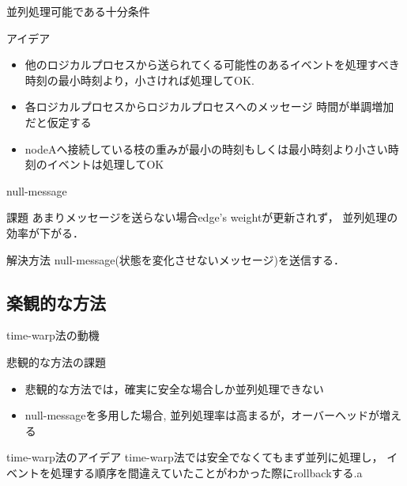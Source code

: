 \documentclass[dvipdfmx,uplatex,11pt]{beamer}
\theoremstyle{definition}
\begin{document}
\begin{frame}{並列処理可能である十分条件}
  \begin{block}{アイデア}
    \begin{itemize}
      \item 他のロジカルプロセスから送られてくる可能性のあるイベントを処理すべき時刻の最小時刻より，小さければ処理してOK.
      \item 各ロジカルプロセスからロジカルプロセスへのメッセージ
            時間が単調増加だと仮定する
          \item nodeAへ接続している枝の重みが最小の時刻もしくは最小時刻より小さい時刻のイベントは処理してOK
    \end{itemize}

  \end{block}
\end{frame}

\begin{frame}{null-message}
  \begin{block}{課題}
    あまりメッセージを送らない場合edge's weightが更新されず，
    並列処理の効率が下がる．
  \end{block}
  \begin{block}{解決方法}
    null-message(状態を変化させないメッセージ)を送信する．
  \end{block}
\end{frame}

\subsection{楽観的な方法}
\begin{frame}{time-warp法の動機}
  \begin{block}{悲観的な方法の課題}
    \begin{itemize}
  \item 悲観的な方法では，確実に安全な場合しか並列処理できない
  \item null-messageを多用した場合, 並列処理率は高まるが，オーバーヘッドが増える
\end{itemize}
  \end{block}

  \begin{block}{time-warp法のアイデア}
  time-warp法では安全でなくてもまず並列に処理し，
  イベントを処理する順序を間違えていたことがわかった際にrollbackする.a
  \end{block}

\end{frame}
\end{document}

